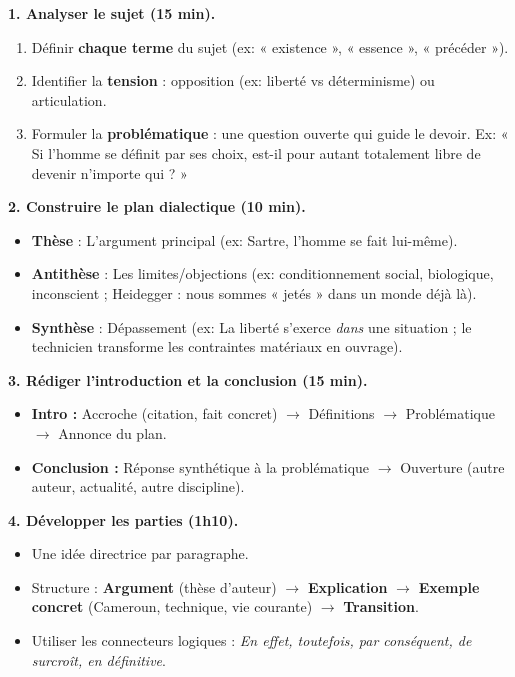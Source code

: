 \documentclass[11pt]{article}
\begin{document}
\begin{methode}
\textbf{1. Analyser le sujet (15 min).}
\begin{enumerate}
\item Définir \textbf{chaque terme} du sujet (ex: « existence », « essence », « précéder »).
\item Identifier la \textbf{tension} : opposition (ex: liberté vs déterminisme) ou articulation.
\item Formuler la \textbf{problématique} : une question ouverte qui guide le devoir. Ex: « Si l'homme se définit par ses choix, est-il pour autant totalement libre de devenir n'importe qui ? »
\end{enumerate}

\textbf{2. Construire le plan dialectique (10 min).}
\begin{itemize}
\item \textbf{Thèse} : L'argument principal (ex: Sartre, l'homme se fait lui-même).
\item \textbf{Antithèse} : Les limites/objections (ex: conditionnement social, biologique, inconscient ; Heidegger : nous sommes « jetés » dans un monde déjà là).
\item \textbf{Synthèse} : Dépassement (ex: La liberté s'exerce \emph{dans} une situation ; le technicien transforme les contraintes matériaux en ouvrage).
\end{itemize}

\textbf{3. Rédiger l'introduction et la conclusion (15 min).}
\begin{itemize}
\item \textbf{Intro :} Accroche (citation, fait concret) $\rightarrow$ Définitions $\rightarrow$ Problématique $\rightarrow$ Annonce du plan.
\item \textbf{Conclusion :} Réponse synthétique à la problématique $\rightarrow$ Ouverture (autre auteur, actualité, autre discipline).
\end{itemize}

\textbf{4. Développer les parties (1h10).}
\begin{itemize}
\item Une idée directrice par paragraphe.
\item Structure : \textbf{Argument} (thèse d'auteur) $\rightarrow$ \textbf{Explication} $\rightarrow$ \textbf{Exemple concret} (Cameroun, technique, vie courante) $\rightarrow$ \textbf{Transition}.
\item Utiliser les connecteurs logiques : \emph{En effet, toutefois, par conséquent, de surcroît, en définitive}.
\end{itemize}
\end{methode}
\end{document}
